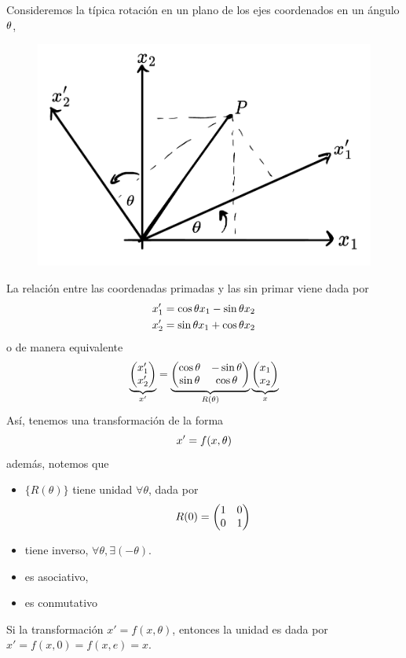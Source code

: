 \begin{ej}
Consideremos la típica rotación en un plano de los ejes coordenados en un ángulo $\theta$,
	\begin{figure}[h!]
		\centering
		\includegraphics[scale=0.5]{sistema-coord.pdf}
	\end{figure}
La relación entre las coordenadas primadas y las sin primar viene dada por
\begin{align}
  x'_1&=\cos\theta x_1-\sin\theta x_2\\
  x'_2&=\sin\theta x_1+\cos\theta x_2
\end{align}
o de manera equivalente
\begin{equation}
  \underbrace{\mqty(x_1'\\x'_2)}_{x'}=\underbrace{\mqty(\cos\th&-\sin\th\\\sin\th&\cos\th)}_{R(\th)}\underbrace{\mqty(x_1\\x_2)}_{x}
\end{equation}
Así, tenemos una transformación de la forma 
\begin{equation}
  x'=f(x,\theta )
\end{equation}
además, notemos que 
\begin{itemize}
\item $\{R(\theta)\}$ tiene unidad $\forall \theta$, dada por
\begin{equation}
  R(0)=\mqty(1&0\\0&1)
\end{equation}
\item tiene inverso, $\forall\theta, \exists (-\theta)$.
\item es asociativo,
\item es conmutativo
\end{itemize}
Si la transformación $x'=f(x,\theta)$, entonces la unidad es dada por $x'=f(x,0)=f(x,e)=x$.
\end{ej}

